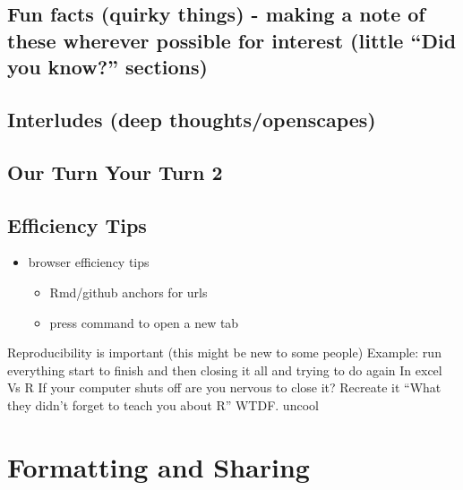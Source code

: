 \documentclass[]{book}
\providecommand{\tightlist}{%
  \setlength{\itemsep}{0pt}\setlength{\parskip}{0pt}}
\begin{document}
\hypertarget{fun-facts-quirky-things---making-a-note-of-these-wherever-possible-for-interest-little-did-you-know-sections-2}{%
\section{Fun facts (quirky things) - making a note of these wherever possible for interest (little ``Did you know?'' sections)}\label{fun-facts-quirky-things---making-a-note-of-these-wherever-possible-for-interest-little-did-you-know-sections-2}}

\hypertarget{interludes-deep-thoughtsopenscapes-5}{%
\section{Interludes (deep thoughts/openscapes)}\label{interludes-deep-thoughtsopenscapes-5}}

\hypertarget{our-turn-your-turn-2-3}{%
\section{Our Turn Your Turn 2}\label{our-turn-your-turn-2-3}}

\hypertarget{efficiency-tips-5}{%
\section{Efficiency Tips}\label{efficiency-tips-5}}

\begin{itemize}
\tightlist
\item
  browser efficiency tips

  \begin{itemize}
  \tightlist
  \item
    Rmd/github anchors for urls
  \item
    press command to open a new tab
  \end{itemize}
\end{itemize}

Reproducibility is important (this might be new to some people)
Example: run everything start to finish and then closing it all and trying to do again
In excel
Vs R
If your computer shuts off are you nervous to close it?
Recreate it
``What they didn't forget to teach you about R'' WTDF. uncool

\hypertarget{format}{%
\chapter{Formatting and Sharing}\label{format}}
\end{document}
